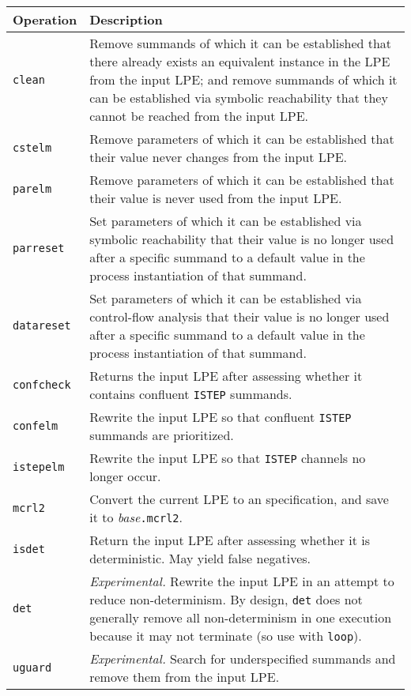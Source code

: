 \begin{tabularx}{\linewidth}{l|X|}
\textbf{Operation} & \textbf{Description} \\ \hline
\texttt{clean} & Remove summands of which it can be established that there already exists an equivalent instance in the LPE from the input LPE; and remove summands of which it can be established via symbolic reachability that they cannot be reached from the input LPE. \\ \hline
\texttt{cstelm} & Remove parameters of which it can be established that their value never changes from the input LPE. \\ \hline
\texttt{parelm} & Remove parameters of which it can be established that their value is never used from the input LPE. \\ \hline
\texttt{parreset} & Set parameters of which it can be established via symbolic reachability that their value is no longer used after a specific summand to a default value in the process instantiation of that summand. \\ \hline
\texttt{datareset} & Set parameters of which it can be established via control-flow analysis that their value is no longer used after a specific summand to a default value in the process instantiation of that summand. \\ \hline
\texttt{confcheck} & Returns the input LPE after assessing whether it contains confluent \texttt{ISTEP} summands. \\ \hline
\texttt{confelm} & Rewrite the input LPE so that confluent \texttt{ISTEP} summands are prioritized. \\ \hline
\texttt{istepelm} & Rewrite the input LPE so that \texttt{ISTEP} channels no longer occur. \\ \hline
\texttt{mcrl2} & Convert the current LPE to an \mcrl{} specification, and save it to \textit{base}\texttt{.mcrl2}. \\ \hline
\texttt{isdet} & Return the input LPE after assessing whether it is deterministic. May yield false negatives. \\ \hline
\texttt{det} & \textit{Experimental.} Rewrite the input LPE in an attempt to reduce non-determinism. By design, \texttt{det} does not generally remove all non-determinism in one execution because it may not terminate (so use with \texttt{loop}). \\ \hline
\texttt{uguard} & \textit{Experimental.} Search for underspecified summands and remove them from the input LPE. \\ \hline
\end{tabularx}

